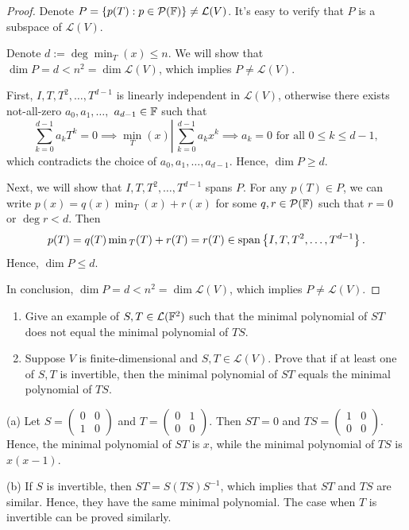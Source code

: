 \documentclass{article}
\begin{document}
\begin{proof}
  Denote \( P=\left\{ p(T):p\in \mathcal{P}(\mathbb{F}) \right\}\neq \mathcal{L}(V) \). It's easy to verify that \( P \) is a subspace of \( \mathcal{L}(V) \). \par
  Denote \( d:=\deg\min_T(x)\le n \). We will show that \( \dim P= d < n^2=\dim\mathcal{L}(V) \), which implies \( P \neq \mathcal{L}(V) \). \par
  First, \( I,T,T^2,\dots,T^{d-1} \) is linearly independent in \( \mathcal{L}(V) \), otherwise there exists not-all-zero \( a_0, a_1, \dots, \) \(a_{d-1} \in \mathbb{F} \) such that
  \[ \sum_{k=0}^{d-1}a_kT^k=0\implies\min_T(x)\left|\,\sum_{k=0}^{d-1}a_kx^k\right.\implies a_k=0 \text{ for all }0\le k\le d-1, \]
  which contradicts the choice of \( a_0,a_1,\dots,a_{d-1} \). Hence, \( \dim P\ge d \).\par
  Next, we will show that \( I,T,T^2,\dots,T^{d-1} \) spans \( P \). For any \( p(T)\in P \), we can write \( p(x)=q(x)\min_T(x)+r(x) \) for some \( q,r\in \mathcal{P}(\mathbb{F}) \) such that \( r=0 \) or \( \deg r < d \). Then
  \[ p(T)=q(T)\min{}_T(T)+r(T)=r(T)\in\operatorname{span}\left\{ I,T,T^2,\dots,T^{d-1} \right\}. \]
  Hence, \( \dim P\le d \). \par
  In conclusion, \( \dim P=d < n^2=\dim\mathcal{L}(V) \), which implies \( P \neq \mathcal{L}(V) \).
\end{proof}



\begin{problem}[5B-7]
\begin{enumerate}[label=(\alph*)]
  \item Give an example of $S, T \in \mathcal{L}(\mathbb{F}^2)$ such that the minimal polynomial of $ST$ does not equal the minimal polynomial of $TS$.
  \item Suppose $V$ is finite-dimensional and $S, T \in \mathcal{L}(V)$. Prove that if at least one of $S, T$ is invertible, then the minimal polynomial of $ST$ equals the minimal polynomial of $TS$.
\end{enumerate}
\end{problem}

\begin{solution}
  (a) Let \( S=\begin{pmatrix}
    0 & 0 \\
    1 & 0
  \end{pmatrix} \) and \( T=\begin{pmatrix}
    0 & 1 \\
    0 & 0
  \end{pmatrix} \). Then \( ST=0 \) and \( TS=\begin{pmatrix}
    1 & 0 \\
    0 & 0
  \end{pmatrix} \). Hence, the minimal polynomial of \( ST \) is \( x \), while the minimal polynomial of \( TS \) is \( x(x-1) \).
  \par
  (b) If \( S \) is invertible, then \( ST=S(TS)S^{-1} \), which implies that \( ST \) and \( TS \) are similar. Hence, they have the same minimal polynomial. The case when \( T \) is invertible can be proved similarly.
\end{solution}
\end{document}
